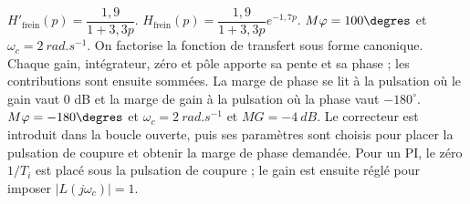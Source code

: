 \begin{corrigebox}[Corrigé]
$H'_{\text{frein}} ( p) = \dfrac{1,9}{1+3,3 p} $.
$H_{\text{frein}} ( p) = \dfrac{1,9}{1+3,3 p} e^{-1,7 p}$.
$M\varphi = 100\degres$ et $\omega_c = \SI{2}{rad.s^{-1}}$.
On factorise la fonction de transfert sous forme canonique. Chaque gain, intégrateur, zéro et pôle apporte sa pente et sa phase ; les contributions sont ensuite sommées. La marge de phase se lit à la pulsation où le gain vaut $0$ dB et la marge de gain à la pulsation où la phase vaut $-180^\circ$.
$M\varphi = -180\degres$ et $\omega_c = \SI{2}{rad.s^{-1}}$ et $MG = \SI{-4}{dB}$.
Le correcteur est introduit dans la boucle ouverte, puis ses paramètres sont choisis pour placer la pulsation de coupure et obtenir la marge de phase demandée. Pour un PI, le zéro $1/T_i$ est placé sous la pulsation de coupure ; le gain est ensuite réglé pour imposer $|L(j\omega_c)|=1$.
\end{corrigebox}
